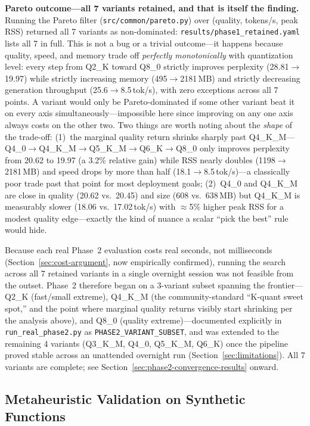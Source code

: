 \documentclass[journal]{IEEEtran}
\begin{document}
\textbf{Pareto outcome---all 7 variants retained, and that is itself the finding.} Running the Pareto filter (\texttt{src/common/pareto.py}) over (quality, tokens/s, peak RSS) returned all 7 variants as non-dominated: \texttt{results/phase1\_retained.yaml} lists all 7 in full. This is not a bug or a trivial outcome---it happens because quality, speed, and memory trade off \emph{perfectly monotonically} with quantization level: every step from Q2\_K toward Q8\_0 strictly improves perplexity (28.81$\to$19.97) while strictly increasing memory (495$\to$2181\,MB) and strictly decreasing generation throughput (25.6$\to$8.5\,tok/s), with zero exceptions across all 7 points. A variant would only be Pareto-dominated if some other variant beat it on every axis simultaneously---impossible here since improving on any one axis always costs on the other two. Two things are worth noting about the \emph{shape} of the trade-off: (1)~the marginal quality return shrinks sharply past Q4\_K\_M---Q4\_0$\to$Q4\_K\_M$\to$Q5\_K\_M$\to$Q6\_K$\to$Q8\_0 only improves perplexity from 20.62 to 19.97 (a 3.2\% relative gain) while RSS nearly doubles (1198$\to$2181\,MB) and speed drops by more than half (18.1$\to$8.5\,tok/s)---a classically poor trade past that point for most deployment goals; (2)~Q4\_0 and Q4\_K\_M are close in quality (20.62 vs.\ 20.45) and size (608 vs.\ 638\,MB) but Q4\_K\_M is measurably slower (18.06 vs.\ 17.02\,tok/s) with $\approx$5\% higher peak RSS for a modest quality edge---exactly the kind of nuance a scalar ``pick the best'' rule would hide.

Because each real Phase~2 evaluation costs real seconds, not milliseconds (Section~\ref{sec:cost-argument}, now empirically confirmed), running the search across all 7 retained variants in a single overnight session was not feasible from the outset. Phase~2 therefore began on a 3-variant subset spanning the frontier---Q2\_K (fast/small extreme), Q4\_K\_M (the community-standard ``K-quant sweet spot,'' and the point where marginal quality returns visibly start shrinking per the analysis above), and Q8\_0 (quality extreme)---documented explicitly in \texttt{run\_real\_phase2.py} as \texttt{PHASE2\_VARIANT\_SUBSET}, and was extended to the remaining 4 variants (Q3\_K\_M, Q4\_0, Q5\_K\_M, Q6\_K) once the pipeline proved stable across an unattended overnight run (Section~\ref{sec:limitations}). All 7 variants are complete; see Section~\ref{sec:phase2-convergence-results} onward.

\subsection{Metaheuristic Validation on Synthetic Functions}
\label{sec:validation-results}
\end{document}
